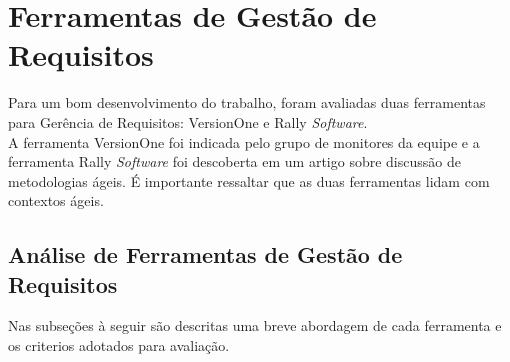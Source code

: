 \chapter[Ferramentas de Gestão de Requisitos]{Ferramentas de Gestão de Requisitos}
\label{chap:ferramenta}
	Para um bom desenvolvimento do trabalho, foram avaliadas duas ferramentas para Gerência de Requisitos: VersionOne e Rally \emph{Software}.
	\\ \indent A ferramenta VersionOne foi indicada pelo grupo de monitores da equipe e a ferramenta Rally \emph{Software} foi descoberta em um artigo sobre discussão de metodologias ágeis. É importante ressaltar que as duas ferramentas lidam com contextos ágeis.
	\section[Análise de Ferramentas de Gestão de Requisitos]{Análise de Ferramentas de Gestão de Requisitos}
	\label{sec:ferramenta_analise}
		Nas subseções à seguir são descritas uma breve abordagem de cada ferramenta e os criterios adotados para avaliação.

